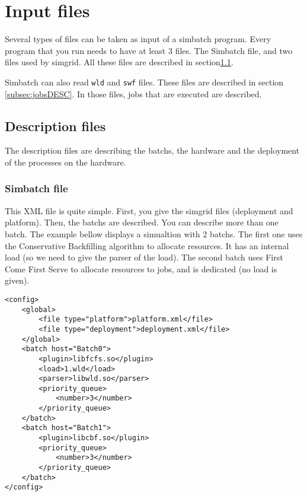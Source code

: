 \section{Input files}
\label{sec:input}

Several types of files can be taken as input of a simbatch
program. Every program that you run needs to have at least 3
files. The Simbatch file, and two files used by simgrid. All these
files are described in section\ref{subsec:description}.

Simbatch can also read \verb+wld+ and \verb+swf+ files. These files
are described in section \ref{subsec:jobsDESC}. In those files, jobs
that are executed are described.

\subsection{Description files}
\label{subsec:description}

The description files are describing the batchs, the hardware and the
deployment of the processes on the hardware.

\subsubsection{Simbatch file}
\label{subsubsec:SBfile}

This XML file is quite simple. First, you give the simgrid files
(deployment and platform). Then, the batchs are described. You can
describe more than one batch. The example bellow displays a simualtion
with 2 batchs. The first one uses the Conservative Backfilling
algorithm to allocate resources. It has an internal load (so we need
to give the parser of the load). The second batch uses First Come
First Serve to allocate resources to jobs, and is dedicated (no load
is given).

{\small
\begin{verbatim}
<config>  
    <global>
        <file type="platform">platform.xml</file>
        <file type="deployment">deployment.xml</file>
    </global>
    <batch host="Batch0">
        <plugin>libfcfs.so</plugin>
        <load>1.wld</load>
        <parser>libwld.so</parser>
        <priority_queue>
            <number>3</number>
        </priority_queue>
    </batch>
    <batch host="Batch1">
        <plugin>libcbf.so</plugin>
        <priority_queue>
            <number>3</number>
        </priority_queue>
    </batch>
</config>
\end{verbatim}}

